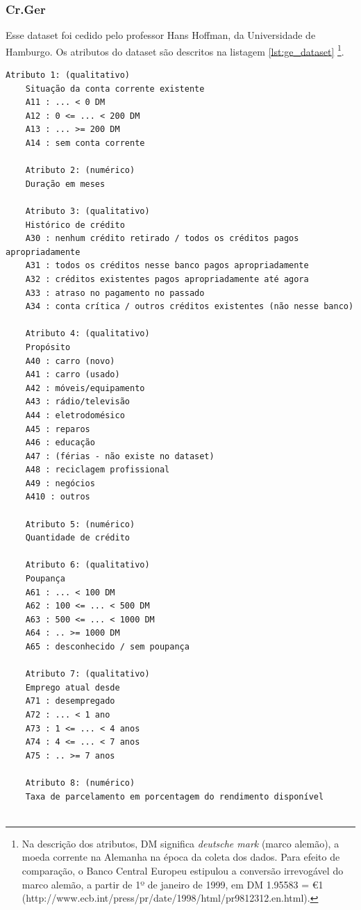 \subsubsection{Cr.Ger}

Esse dataset foi cedido pelo professor Hans Hoffman, da Universidade de Hamburgo. Os atributos do dataset são descritos na listagem \ref{lst:ge_dataset} \footnote{Na descrição dos atributos, DM significa \emph{deutsche mark} (marco alemão), a moeda corrente na Alemanha na época da coleta dos dados. Para efeito de comparação, o Banco Central Europeu estipulou a conversão irrevogável do marco alemão, a partir de 1º de janeiro de 1999, em DM 1.95583 = \euro 1 (http://www.ecb.int/press/pr/date/1998/html/pr981231\textunderscore2.en.html).}.

\begin{lstlisting}[caption=Atributos do dataset alemão,label=lst:ge_dataset]
    Atributo 1: (qualitativo)
    Situação da conta corrente existente
    A11 : ... < 0 DM
    A12 : 0 <= ... < 200 DM
    A13 : ... >= 200 DM
    A14 : sem conta corrente

    Atributo 2: (numérico)
    Duração em meses

    Atributo 3: (qualitativo)
    Histórico de crédito
    A30 : nenhum crédito retirado / todos os créditos pagos apropriadamente
    A31 : todos os créditos nesse banco pagos apropriadamente
    A32 : créditos existentes pagos apropriadamente até agora
    A33 : atraso no pagamento no passado
    A34 : conta crítica / outros créditos existentes (não nesse banco)

    Atributo 4: (qualitativo)
    Propósito
    A40 : carro (novo)
    A41 : carro (usado)
    A42 : móveis/equipamento
    A43 : rádio/televisão
    A44 : eletrodomésico
    A45 : reparos
    A46 : educação
    A47 : (férias - não existe no dataset)
    A48 : reciclagem profissional
    A49 : negócios
    A410 : outros

    Atributo 5: (numérico)
    Quantidade de crédito

    Atributo 6: (qualitativo)
    Poupança
    A61 : ... < 100 DM
    A62 : 100 <= ... < 500 DM
    A63 : 500 <= ... < 1000 DM
    A64 : .. >= 1000 DM
    A65 : desconhecido / sem poupança

    Atributo 7: (qualitativo)
    Emprego atual desde
    A71 : desempregado
    A72 : ... < 1 ano
    A73 : 1 <= ... < 4 anos
    A74 : 4 <= ... < 7 anos
    A75 : .. >= 7 anos

    Atributo 8: (numérico)
    Taxa de parcelamento em porcentagem do rendimento disponível


\end{lstlisting}
